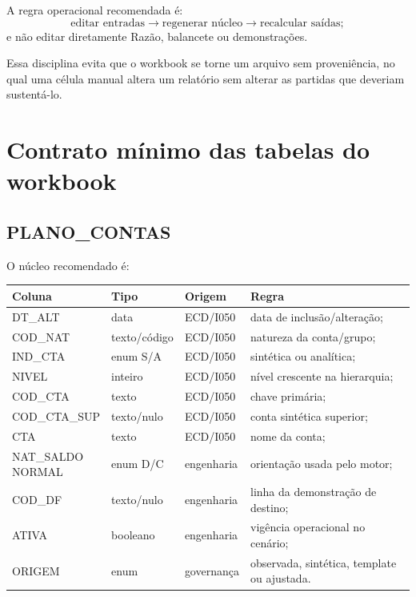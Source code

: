 \documentclass[11pt,a4paper]{article}
\begin{document}
A regra operacional recomendada é:
\begin{equation}
\boxed{
\text{editar entradas}
\longrightarrow
\text{regenerar núcleo}
\longrightarrow
\text{recalcular saídas};
}
\end{equation}
e não editar diretamente Razão, balancete ou demonstrações.

Essa disciplina evita que o workbook se torne um arquivo sem proveniência, no qual uma célula manual altera um relatório sem alterar as partidas que deveriam sustentá-lo.

\section{Contrato mínimo das tabelas do workbook}

\subsection{PLANO\_CONTAS}

O núcleo recomendado é:
\begin{longtable}{p{} p{} p{} p{}}
\toprule
\textbf{Coluna} & \textbf{Tipo} & \textbf{Origem} & \textbf{Regra}\\
\midrule
DT\_ALT & data & ECD/I050 & data de inclusão/alteração;\\
COD\_NAT & texto/código & ECD/I050 & natureza da conta/grupo;\\
IND\_CTA & enum S/A & ECD/I050 & sintética ou analítica;\\
NIVEL & inteiro & ECD/I050 & nível crescente na hierarquia;\\
COD\_CTA & texto & ECD/I050 & chave primária;\\
COD\_CTA\_SUP & texto/nulo & ECD/I050 & conta sintética superior;\\
CTA & texto & ECD/I050 & nome da conta;\\
\makecell[l]{NAT\_SALDO\\ NORMAL} & enum D/C & engenharia & orientação usada pelo motor;\\
COD\_DF & texto/nulo & engenharia & linha da demonstração de destino;\\
ATIVA & booleano & engenharia & vigência operacional no cenário;\\
ORIGEM & enum & governança & observada, sintética, template ou ajustada.\\
\bottomrule
\end{longtable}
\end{document}

